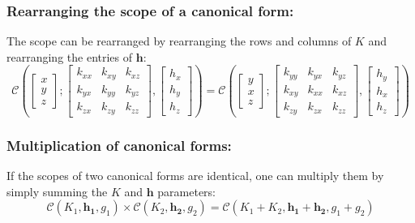 \documentclass[12pt,oneside,openany,a4paper, %
afrikaans,english,
]{memoir}
\numberwithin{equation}{chapter}
\begin{document}
\subsubsection{Rearranging the scope of a canonical form:}
The scope can be rearranged by rearranging the rows and columns of $K$  and rearranging the entries of $\bm{h}$:
\begin{equation}
\mathcal{C}\left(
\begin{bmatrix}
x\\
y\\
z
\end{bmatrix};
\begin{bmatrix}
k_{xx} & k_{xy} & k_{xz}\\
k_{yx} & k_{yy} & k_{yz}\\
k_{zx} & k_{zy} & k_{zz}
\end{bmatrix},
\begin{bmatrix}
h_x\\
h_y\\
h_z
\end{bmatrix}
\right)
=
\mathcal{C}\left(
\begin{bmatrix}
y\\
x\\
z
\end{bmatrix};
\begin{bmatrix}
k_{yy} & k_{yx} & k_{yz}\\
k_{xy} & k_{xx} & k_{xz}\\
k_{zy} & k_{zx} & k_{zz}
\end{bmatrix},
\begin{bmatrix}
h_y\\
h_x\\
h_z
\end{bmatrix}
\right)
\end{equation}
\subsubsection{Multiplication of canonical forms:}
If the scopes of two canonical forms are identical, one can multiply them by simply summing the $K$ and $\bm{h}$ parameters:
\begin{equation}\label{eq:10}
\mathcal{C}(K_1,\bm{h_1},g_1)\times\mathcal{C}(K_2,\bm{h_2},g_2) = \mathcal{C}(K_1 + K_2,\bm{h_1} + \bm{h_2},g_1 + g_2)
\end{equation}
\end{document}
